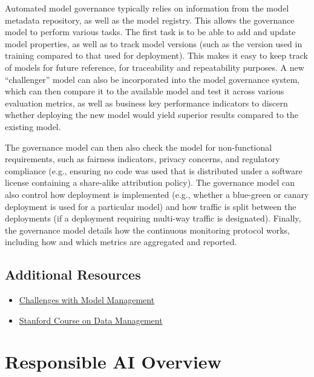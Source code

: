 {{{{{{{{    Automated model governance typically relies on information from the model metadata repository, as well as the model registry. This allows the governance model to perform various tasks. The first task is to be able to add and update model properties, as well as to track model versions (such as the version used in training compared to that used for deployment). This makes it easy to keep track of models for future reference, for traceability and repeatability purposes. A new “challenger” model can also be incorporated into the model governance system, which can then compare it to the available model and test it across various evaluation metrics, as well as business key performance indicators to discern whether deploying the new model would yield superior results compared to the existing model.
    
    The governance model can then also check the model for non-functional requirements, such as fairness indicators, privacy concerns, and regulatory compliance (e.g., ensuring no code was used that is distributed under a software license containing a share-alike attribution policy). The governance model can also control how deployment is implemented (e.g., whether a blue-green or canary deployment is used for a particular model) and how traffic is split between the deployments (if a deployment requiring multi-way traffic is designated). Finally, the governance model details how the continuous monitoring protocol works, including how and which metrics are aggregated and reported.
    
    \subsection{Additional Resources}
    
    \begin{itemize}
      \item \href{https://neptune.ai/blog/machine-learning-model-management}{Challenges with Model Management}
      \item \href{https://thodrek.github.io/cs839_sp20/}{Stanford Course on Data Management}
    \end{itemize}
  

\section{Responsible AI Overview}

}}}}}}}}
